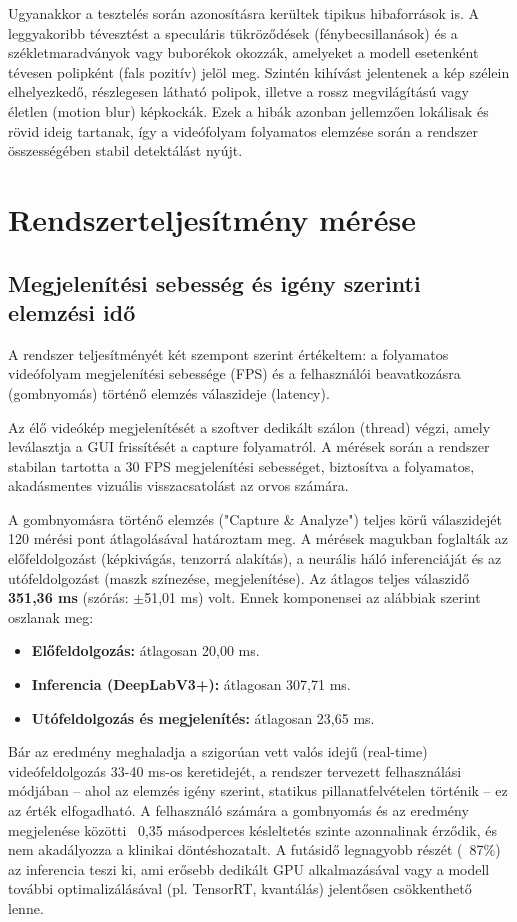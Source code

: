 \documentclass[12pt, a4paper]{report}
\begin{document}
Ugyanakkor a tesztelés során azonosításra kerültek tipikus hibaforrások is. A leggyakoribb tévesztést a speculáris tükröződések (fénybecsillanások) és a székletmaradványok vagy buborékok okozzák, amelyeket a modell esetenként tévesen polipként (fals pozitív) jelöl meg. Szintén kihívást jelentenek a kép szélein elhelyezkedő, részlegesen látható polipok, illetve a rossz megvilágítású vagy életlen (motion blur) képkockák. Ezek a hibák azonban jellemzően lokálisak és rövid ideig tartanak, így a videófolyam folyamatos elemzése során a rendszer összességében stabil detektálást nyújt.

\section{Rendszerteljesítmény mérése}

\subsection{Megjelenítési sebesség és igény szerinti elemzési idő}
A rendszer teljesítményét két szempont szerint értékeltem: a folyamatos videófolyam megjelenítési sebessége (FPS) és a felhasználói beavatkozásra (gombnyomás) történő elemzés válaszideje (latency).

Az élő videókép megjelenítését a szoftver dedikált szálon (thread) végzi, amely leválasztja a GUI frissítését a capture folyamatról. A mérések során a rendszer stabilan tartotta a 30 FPS megjelenítési sebességet, biztosítva a folyamatos, akadásmentes vizuális visszacsatolást az orvos számára.

A gombnyomásra történő elemzés ("Capture \& Analyze") teljes körű válaszidejét 120 mérési pont átlagolásával határoztam meg. A mérések magukban foglalták az előfeldolgozást (képkivágás, tenzorrá alakítás), a neurális háló inferenciáját és az utófeldolgozást (maszk színezése, megjelenítése). Az átlagos teljes válaszidő \textbf{351,36 ms} (szórás: $\pm$51,01 ms) volt. Ennek komponensei az alábbiak szerint oszlanak meg:
\begin{itemize}
    \item \textbf{Előfeldolgozás:} átlagosan 20,00 ms.
    \item \textbf{Inferencia (DeepLabV3+):} átlagosan 307,71 ms.
    \item \textbf{Utófeldolgozás és megjelenítés:} átlagosan 23,65 ms.
\end{itemize}

Bár az eredmény meghaladja a szigorúan vett valós idejű (real-time) videófeldolgozás 33-40 ms-os keretidejét, a rendszer tervezett felhasználási módjában -- ahol az elemzés igény szerint, statikus pillanatfelvételen történik -- ez az érték elfogadható. A felhasználó számára a gombnyomás és az eredmény megjelenése közötti ~0,35 másodperces késleltetés szinte azonnalinak érződik, és nem akadályozza a klinikai döntéshozatalt. A futásidő legnagyobb részét (~87\%) az inferencia teszi ki, ami erősebb dedikált GPU alkalmazásával vagy a modell további optimalizálásával (pl. TensorRT, kvantálás) jelentősen csökkenthető lenne.
\end{document}
